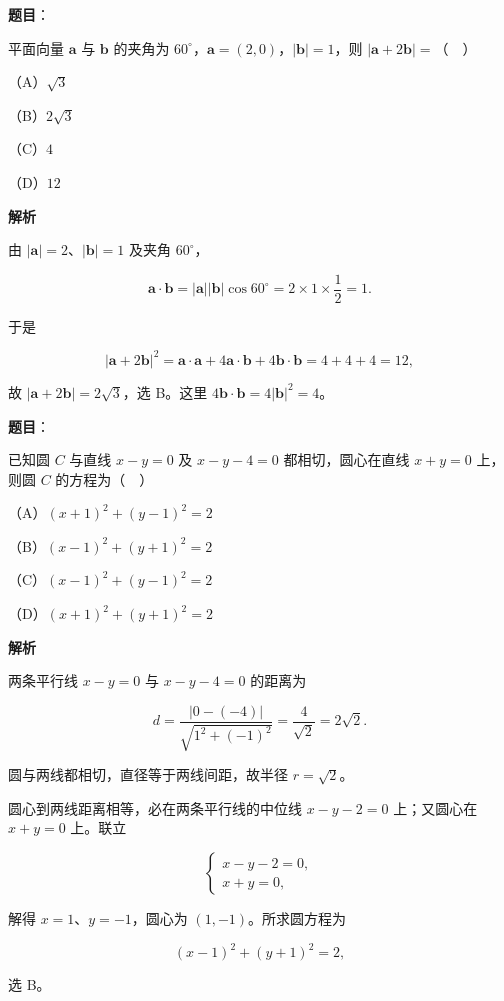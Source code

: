 \begin{answer}

\textbf{题目}：

平面向量 $\boldsymbol a$ 与 $\boldsymbol b$ 的夹角为 $60^\circ$，$\boldsymbol a=(2,0)$，$|\boldsymbol b|=1$，则 $|\boldsymbol a+2\boldsymbol b|=$（　）

（A）$\sqrt3$

（B）$2\sqrt3$

（C）$4$

（D）$12$

\textbf{解析}

由 $|\boldsymbol a|=2$、$|\boldsymbol b|=1$ 及夹角 $60^\circ$，

\nopagebreak[4]
\[\boldsymbol a\cdot\boldsymbol b
=|\boldsymbol a||\boldsymbol b|\cos60^\circ
=2\times1\times\frac12=1 .\]

于是

\nopagebreak[4]
\[|\boldsymbol a+2\boldsymbol b|^2
=\boldsymbol a\cdot\boldsymbol a+4\boldsymbol a\cdot\boldsymbol b
+4\boldsymbol b\cdot\boldsymbol b
=4+4+4=12,\]

故 $|\boldsymbol a+2\boldsymbol b|=2\sqrt3$，选 B。这里 $4\boldsymbol b\cdot\boldsymbol b=4|\boldsymbol b|^2=4$。


\end{answer}
\begin{answer}

\textbf{题目}：

已知圆 $C$ 与直线 $x-y=0$ 及 $x-y-4=0$ 都相切，圆心在直线 $x+y=0$ 上，则圆 $C$ 的方程为（　）

（A）$(x+1)^2+(y-1)^2=2$

（B）$(x-1)^2+(y+1)^2=2$

（C）$(x-1)^2+(y-1)^2=2$

（D）$(x+1)^2+(y+1)^2=2$

\textbf{解析}

两条平行线 $x-y=0$ 与 $x-y-4=0$ 的距离为

\nopagebreak[4]
\[d=\frac{|0-(-4)|}{\sqrt{1^2+(-1)^2}}
=\frac4{\sqrt2}=2\sqrt2 .\]

圆与两线都相切，直径等于两线间距，故半径 $r=\sqrt2$。

圆心到两线距离相等，必在两条平行线的中位线 $x-y-2=0$ 上；又圆心在 $x+y=0$ 上。联立

\nopagebreak[4]
\[\begin{cases}x-y-2=0,\\ x+y=0,\end{cases}\]

解得 $x=1$、$y=-1$，圆心为 $(1,-1)$。所求圆方程为

\nopagebreak[4]
\[(x-1)^2+(y+1)^2=2,\]

选 B。


\end{answer}
